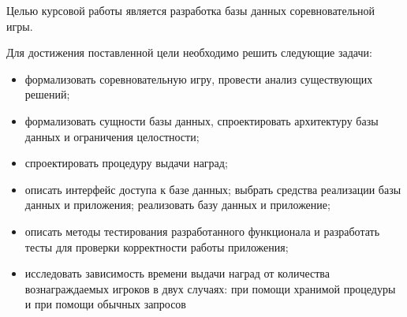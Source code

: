 
Целью курсовой работы является разработка базы данных соревновательной игры.
 
Для достижения поставленной цели необходимо решить следующие задачи:
\begin{itemize}
	\item формализовать соревновательную игру, провести анализ существующих решений;
	\item формализовать сущности базы данных, спроектировать архитектуру базы данных и ограничения целостности;
	\item спроектировать процедуру выдачи наград;
	\item описать интерфейс доступа к базе данных; выбрать средства реализации базы данных и приложения; реализовать базу данных и приложение;
	\item описать методы тестирования разработанного функционала и разработать тесты для проверки корректности работы приложения;
	\item исследовать зависимость времени выдачи наград от количества вознаграждаемых игроков в двух случаях: при помощи хранимой процедуры и при помощи обычных запросов
\end{itemize}

\clearpage
